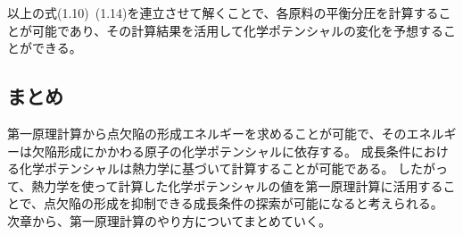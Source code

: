 以上の式(1.10)~(1.14)を連立させて解くことで、各原料の平衡分圧を計算することが可能であり、その計算結果を活用して化学ポテンシャルの変化を予想することができる。

\subsection{まとめ}
第一原理計算から点欠陥の形成エネルギーを求めることが可能で、そのエネルギーは欠陥形成にかかわる原子の化学ポテンシャルに依存する。
成長条件における化学ポテンシャルは熱力学に基づいて計算することが可能である。
したがって、熱力学を使って計算した化学ポテンシャルの値を第一原理計算に活用することで、点欠陥の形成を抑制できる成長条件の探索が可能になると考えられる。
次章から、第一原理計算のやり方についてまとめていく。
